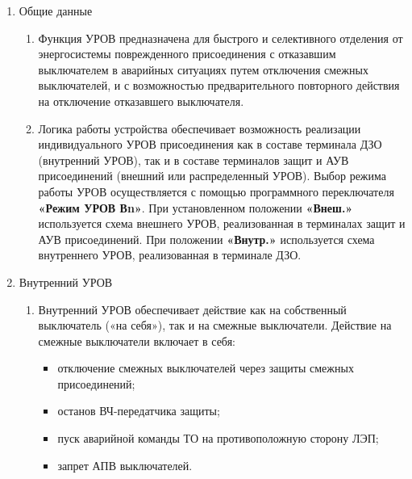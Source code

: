 \color{black}

\begin{enumerate}[label=\arabic{section}.\arabic{subsection}.\arabic{enumi}, labelsep=4pt, leftmargin=0pt, itemindent=57pt, itemsep=0pt, parsep=5pt] %


\item Общие данные

\begin{enumerate}[label=\arabic{section}.\arabic{subsection}.\arabic{enumi}.\arabic*, labelsep=4pt, leftmargin=0em, itemindent=65pt, parsep=0pt]

\item
Функция УРОВ предназначена для быстрого и селективного отделения от энергосистемы поврежденного
присоединения с отказавшим выключателем в аварийных ситуациях путем отключения смежных
выключателей, и с возможностью предварительного повторного действия на отключение отказавшего
выключателя.

\item
Логика работы устройства обеспечивает возможность реализации индивидуального УРОВ
присоединения как в составе терминала ДЗО (внутренний УРОВ), так и в составе терминалов защит и АУВ
присоединений (внешний или распределенный УРОВ). Выбор режима работы УРОВ осуществляется с
помощью программного переключателя \textbf{«Режим УРОВ Вn»}. При установленном положении \textbf{«Внеш.»}
используется схема внешнего УРОВ, реализованная в терминалах защит и АУВ присоединений. При
положении \textbf{«Внутр.»} используется схема внутреннего УРОВ, реализованная в терминале ДЗО.

\end {enumerate}


\item Внутренний УРОВ

\begin{enumerate}[label=\arabic{section}.\arabic{subsection}.\arabic{enumi}.\arabic*, labelsep=4pt, leftmargin=0em, itemindent=65pt, parsep=0pt]

\item
Внутренний УРОВ обеспечивает действие как на собственный выключатель («на себя»), так и на
смежные выключатели. Действие на смежные выключатели включает в себя:
\begin{itemize}
\item отключение смежных выключателей через защиты смежных присоединений;
\item останов ВЧ-передатчика защиты;
\item пуск аварийной команды ТО на противоположную сторону ЛЭП;
\item запрет АПВ выключателей.
\end{itemize}


\end{enumerate}
\end{enumerate}
